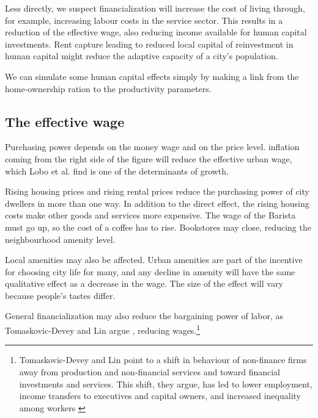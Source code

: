 Less directly, we suspect financialization will increase the cost of living through, for example, increasing labour costs in the service sector. This results in a reduction of the effective wage, also reducing income available for human capital investments. Rent capture leading to reduced local capital of reinvestment in human capital might reduce the adaptive capacity of a city's population.

We can simulate some human capital effects simply by making a link from the home-ownership ration to the productivity parameters.



\subsection{The effective wage}

Purchasing power depends on the money wage and on the price level. inflation coming from the right side of the figure will reduce the effective urban wage, which Lobo et al. find is one of the determinants of growth. 

 Rising housing prices and rising rental prices reduce the purchasing power of city dwellers in more than one way. In addition to the direct effect, the rising housing costs make other goods and services more expensive. The wage of the Barista must go up, so the cost of a coffee has to rise. Bookstores may close, reducing the neighbourhood amenity level. 
 
 Local amenities may also be affected. Urban amenities  are part of the incentive for choosing city life for many, and any decline in amenity will have the same qualitative effect as a decrease in the wage. The size of the effect will vary because people's tastes differ. 


 General financialization may also reduce the bargaining power of labor, as Tomaskovic-Devey and Lin argue \cite{tomaskovic-deveyFinancializationCausesInequality2013}, reducing wages.\footnote{Tomaskovic-Devey and Lin point to a shift in behaviour of non-finance firms away from production and non-financial services and toward financial investments and services. This shift, they argue,  has led to lower employment, income transfers to executives and capital owners, and increased inequality among workers \cite{tomaskovic-deveyFinancializationCausesInequality2013}}


